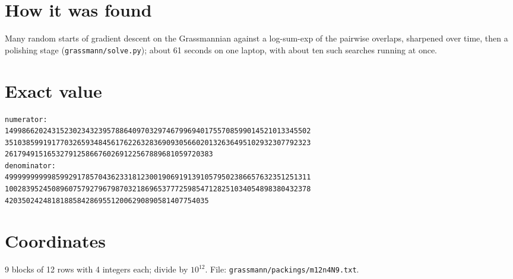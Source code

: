 \documentclass[11pt,a4paper]{article}
\begin{document}
\section{How it was found}
Many random starts of gradient descent on the Grassmannian against a log-sum-exp of the pairwise overlaps, sharpened over time, then a polishing stage (\texttt{grassmann/solve.py}); about 61 seconds on one laptop, with about ten such searches running at once.


\appendix
\section{Exact value}
{\small
\begin{verbatim}
numerator:
149986620243152302343239578864097032974679969401755708599014521013345502
351038599191770326593484561762263283690930566020132636495102932307792323
2617949151653279125866760269122567889681059720383
denominator:
499999999998599291785704362331812300190691913910579502386657632351251311
100283952450896075792796798703218696537772598547128251034054898380432378
420350242481818858428695512006290890581407754035
\end{verbatim}}

\section{Coordinates}
9 blocks of 12 rows with 4 integers each; divide by $10^{12}$. File: \texttt{grassmann/packings/m12n4N9.txt}.
{\tiny
\begin{multicols}{3}
\end{multicols}}
\end{document}
